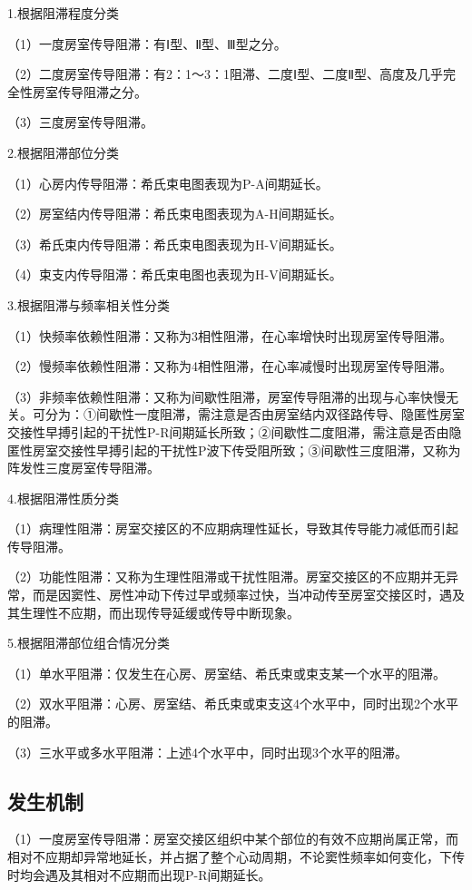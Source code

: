 1.根据阻滞程度分类

（1）一度房室传导阻滞：有Ⅰ型、Ⅱ型、Ⅲ型之分。

（2）二度房室传导阻滞：有2：1～3：1阻滞、二度Ⅰ型、二度Ⅱ型、高度及几乎完全性房室传导阻滞之分。

（3）三度房室传导阻滞。

2.根据阻滞部位分类

（1）心房内传导阻滞：希氏束电图表现为P-A间期延长。

（2）房室结内传导阻滞：希氏束电图表现为A-H间期延长。

（3）希氏束内传导阻滞：希氏束电图表现为H-V间期延长。

（4）束支内传导阻滞：希氏束电图也表现为H-V间期延长。

3.根据阻滞与频率相关性分类

（1）快频率依赖性阻滞：又称为3相性阻滞，在心率增快时出现房室传导阻滞。

（2）慢频率依赖性阻滞：又称为4相性阻滞，在心率减慢时出现房室传导阻滞。

（3）非频率依赖性阻滞：又称为间歇性阻滞，房室传导阻滞的出现与心率快慢无关。可分为：①间歇性一度阻滞，需注意是否由房室结内双径路传导、隐匿性房室交接性早搏引起的干扰性P-R间期延长所致；②间歇性二度阻滞，需注意是否由隐匿性房室交接性早搏引起的干扰性P波下传受阻所致；③间歇性三度阻滞，又称为阵发性三度房室传导阻滞。

4.根据阻滞性质分类

（1）病理性阻滞：房室交接区的不应期病理性延长，导致其传导能力减低而引起传导阻滞。

（2）功能性阻滞：又称为生理性阻滞或干扰性阻滞。房室交接区的不应期并无异常，而是因窦性、房性冲动下传过早或频率过快，当冲动传至房室交接区时，遇及其生理性不应期，而出现传导延缓或传导中断现象。

5.根据阻滞部位组合情况分类

（1）单水平阻滞：仅发生在心房、房室结、希氏束或束支某一个水平的阻滞。

（2）双水平阻滞：心房、房室结、希氏束或束支这4个水平中，同时出现2个水平的阻滞。

（3）三水平或多水平阻滞：上述4个水平中，同时出现3个水平的阻滞。

\protect\hypertarget{text00027.htmlux5cux23subid326}{}{}

\subsection{发生机制}

（1）一度房室传导阻滞：房室交接区组织中某个部位的有效不应期尚属正常，而相对不应期却异常地延长，并占据了整个心动周期，不论窦性频率如何变化，下传时均会遇及其相对不应期而出现P-R间期延长。

